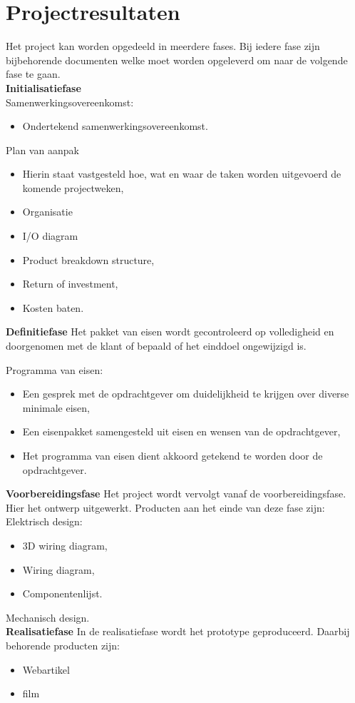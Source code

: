 \section{Projectresultaten}
Het project kan worden opgedeeld in meerdere fases. Bij iedere fase zijn bijbehorende documenten welke moet worden opgeleverd om naar de volgende fase te gaan. \\[0.5cm]

\textbf{Initialisatiefase}\\
Samenwerkingsovereenkomst:
\begin{itemize}
	\item Ondertekend samenwerkingsovereenkomst.
\end{itemize}

Plan van aanpak
\begin{itemize}
	\item Hierin staat vastgesteld hoe, wat en waar de taken worden uitgevoerd de komende projectweken,
	\item Organisatie
	\item I/O diagram
	\item Product breakdown structure,
	\item Return of investment,
	\item Kosten baten.
\end{itemize}

\textbf{Definitiefase}
Het pakket van eisen wordt gecontroleerd op volledigheid en doorgenomen met de klant of bepaald of het einddoel ongewijzigd is.

Programma van eisen:
\begin{itemize}
	\item Een gesprek met de opdrachtgever om duidelijkheid te krijgen over diverse minimale eisen,
	\item Een eisenpakket samengesteld uit eisen en wensen van de opdrachtgever,
	\item Het programma van eisen dient akkoord getekend te worden door de opdrachtgever.
\end{itemize}


\textbf{Voorbereidingsfase}
Het project wordt vervolgt vanaf de voorbereidingsfase. Hier het ontwerp uitgewerkt. Producten aan het einde van deze fase zijn:\\
Elektrisch design:
\begin{itemize}
	\item 3D wiring diagram,
	\item Wiring diagram,
	\item Componentenlijst.
\end{itemize}
Mechanisch design.\\[0.5cm]

\textbf{Realisatiefase} 
In de realisatiefase wordt het prototype geproduceerd. Daarbij behorende producten zijn:
\begin{itemize}
	\item Webartikel
	\item film
\end{itemize}
\newpage
